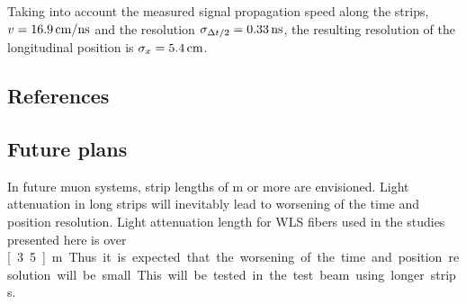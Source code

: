 Taking into account the measured signal propagation speed along the strips, \mbox{$v=\unit[16.9]{cm/ns}$} and the resolution $\sigma_{\Delta t/2} = \unit[0.33]{ns}$, the resulting resolution of the longitudinal position is $\sigma_x = \unit[5.4]{cm}$.

\subsection{References}

\subsection{Future plans}

In future muon systems, strip lengths of \unit[2]{m} or more are envisioned. Light attenuation in long strips will inevitably lead to worsening of the time and position resolution. Light attenuation length for WLS fibers used in the studies presented here is over \unit[3.5]{m}. Thus it is expected that the worsening of the time and position resolution will be small. This will be tested in the test beam using longer strips.
